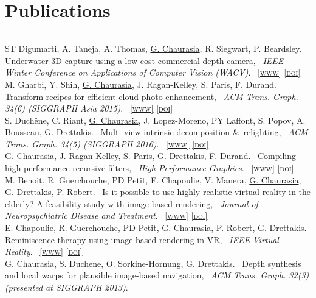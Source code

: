 \documentclass[10pt]{article}
\newcommand{\amper}{{\scshape\&}~}
\newcommand{\notes}[1]{\marginnote{\color{Gray}\small #1}}
\newcommand{\customsection}[1]{\section*{#1}\vspace{-0.2cm}\hrule\vspace{0.1cm}}
\newcommand{\emphasize}[1]{\underline{#1}}
\newcommand{\paper}[1]{{#1,~}}
\newcommand{\authors}[1]{{#1.~}}
\newcommand{\journal}[1]{{\itshape #1}.~}
\newcommand{\link}[2]{\href{#1}{{#2}}}                        %
\newcommand{\html}[1]{\link{#1}{{\scriptsize\scshape[www]}}}
\newcommand{\doi}[1]{\link{#1}{{\scriptsize\scshape[doi]}}}
\begin{document}
\customsection{Publications}
\notes{2016}
\authors{ST Digumarti, A. Taneja, A. Thomas, \emphasize{G. Chaurasia}, R. Siegwart, P. Beardsley}
\paper{Underwater 3D capture using a low-cost commercial depth camera}
\journal{IEEE Winter Conference on Applications of Computer Vision (WACV)}
\html{https://www.disneyresearch.com/publication/underwater-3d-capture/}
\doi{}
\\[0.18cm]
%
\notes{2015}
\authors{M. Gharbi, Y. Shih, \emphasize{G. Chaurasia}, J. Ragan-Kelley, S. Paris, F. Durand}
\paper{Transform recipes for efficient cloud photo enhancement}
\journal{ACM Trans. Graph. 34(6) (SIGGRAPH Asia 2015)}
\html{https://groups.csail.mit.edu/graphics/xform_recipes/}
\doi{http://dx.doi.org/10.1145/2816795.2818127}
\\[0.18cm]
%
\notes{2015}
\authors{S. Duch\^{e}ne, C. Riant, \emphasize{G. Chaurasia}, J. Lopez-Moreno, PY Laffont, S. Popov, A. Bousseau, G. Drettakis}
\paper{Multi view intrinsic decomposition \amper relighting}
\journal{ACM Trans. Graph. 34(5) (SIGGRAPH 2016)}
\html{http://www-sop.inria.fr/reves/Basilic/2015/DRCLLPD15/}
\doi{http://dx.doi.org/10.1145/2790060.2790063}
\\[0.18cm]
%
\notes{2015}
\authors{\emphasize{G. Chaurasia}, J. Ragan-Kelley, S. Paris, G. Drettakis, F. Durand}
\paper{Compiling high performance recursive filters}
\journal{High Performance Graphics}
\html{https://mit-gfx.github.io/recfilter/}
\doi{http://dx.doi.org/10.1145/2790060.2790063}
\\[0.18cm]
%
\notes{2015}
\authors{M. Benoit, R. Guerchouche, PD Petit, E. Chapoulie, V. Manera, \emphasize{G. Chaurasia}, G. Drettakis, P. Robert}
\paper{Is it possible to use highly realistic virtual reality in the elderly? A feasibility study with image-based rendering}
\journal{Journal of Neuropsychiatric Disease and Treatment}
\html{http://www.dovepress.com/articles.php?article_id=20707}
\doi{http://dx.doi.org/10.2147/NDT.S73179}\\[0.18cm]
%
\notes{2014}
\authors{E. Chapoulie, R. Guerchouche, PD Petit, \emphasize{G. Chaurasia}, P. Robert, G. Drettakis}
\paper{Reminiscence therapy using image-based rendering in VR}
\journal{IEEE Virtual Reality}
\html{http://www-sop.inria.fr/reves/Basilic/2014/CGPCRD14/}
\doi{http://dx.doi.org/10.1109/VR.2014.6802049}\\[0.18cm]
%
\notes{2013}
\authors{\emphasize{G. Chaurasia}, S. Duchene, O. Sorkine-Hornung, G. Drettakis}
\paper{Depth synthesis and local warps for plausible image-based navigation}
\journal{ACM Trans. Graph. 32(3) (presented at SIGGRAPH 2013)}
\end{document}
